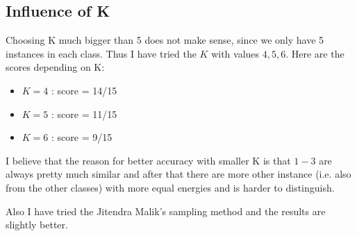 \documentclass[paper=a4, fontsize=11pt]{scrartcl} %
\numberwithin{equation}{section} %
\numberwithin{figure}{section} %
\numberwithin{table}{section} %
\begin{document}
\subsection{Influence of K}

Choosing K much bigger than 5 does not make sense, since we only have 5 instances in each class. Thus I have tried the $K$ with values $4,5,6$. Here are the scores depending on K:
\begin{itemize}
\item $K=4$ : score = 14/15
\item $K=5$ : score = 11/15
\item $K=6$ : score = 9/15
\end{itemize}

I believe that the reason for better accuracy with smaller K is that $1-3$ are always pretty much similar and after that there are more other instance (i.e. also from the other classes) with more equal energies and is harder to distinguish.

Also I have tried the Jitendra Malik's sampling method and the results are slightly better. 
\end{document}
